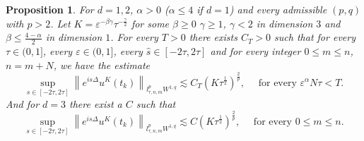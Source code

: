 \documentclass[10pt,a4paper]{article}
\newtheorem{proposition}[theorem]{Proposition}
\begin{document}

  

  \begin{proposition}\label{DuKlpLq}
    For \(d =1,2\), \(\alpha>0\) (\(\alpha \leq 4\) if \(d=1\)) and every
    admissible \((p,q)\) with \(p>2\).
    Let \(K = \varepsilon^{-\beta\gamma}\tau^{-\frac\gamma2}\) for some
    \(\beta\geq0\) \(\gamma\geq1\), \(\gamma<2\) in dimension \(3\) and \(\beta
    \leq \frac{4-\alpha}2\) in dimension \(1\). 
    For every \(T>0\) there exists \(C_T>0\) such that 
    for every \( \tau \in (0,1] \), every \(\varepsilon \in (0,1]\), 
    every \(\hat{s} \in [-2\tau,2\tau] \) and for every integer 
    \(0 \leq m \leq n \), \(n=m+N\), we have the estimate
    \begin{equation}
      \sup_{s\in[-2\tau,2\tau]} \left\|e^{is\Delta} u^K(t_k)\right\|_{l^p_{\tau,n,m}W^{1,q}}
       \lesssim C_T (K\tau^\frac12)^\frac2p, \quad \text{ for every }
       \varepsilon^\alpha N\tau < T.
    \end{equation}
    And for \(d=3\) there exist a \(C\) such that 
    \begin{equation}
      \sup_{s\in[-2\tau,2\tau]} \left\|e^{is\Delta} u^K(t_k)\right\|_{l^p_{\tau,n,m}W^{1,q}}
       \lesssim C (K\tau^\frac12)^\frac2p, \quad \text{ for every } 0 \leq m
       \leq n.
    \end{equation}
  \end{proposition}
\end{document}
